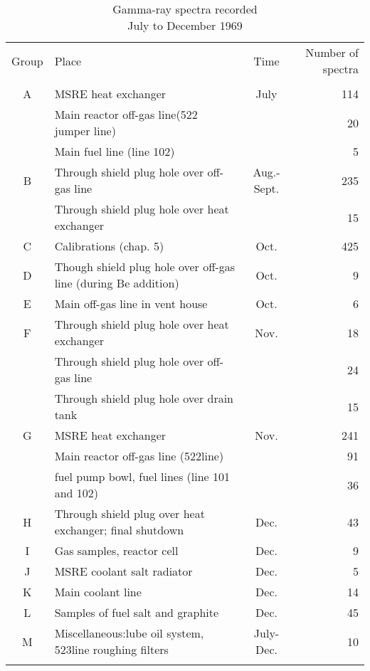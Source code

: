 \begin{table}
\centering
\onelinecaptionsfalse
\caption{Gamma-ray spectra recorded\protect \\July to December 1969}
\label{table_6_1}
\begin{tabular}[c]{clcr}
\hline
\multirow{3}{1cm}{Group } & \multirow{3}{2cm}{Place} &  
\multirow{3}{2cm}{Time}&  \multirow{3}{1cm}{Number of spectra}\\
		\\
		\\
\hline
\\
A  &  MSRE heat exchanger  & July  & 114  \\
   &  Main reactor off-gas line(522 jumper line) &   & 20 \\
   &  Main fuel line (line 102) &  & 5  \\
B  &  Through shield plug hole over off-gas line  & Aug.-Sept.  & 235  \\
   &  Through shield plug hole over heat exchanger &  & 15  \\
C  &  Calibrations (chap. 5)  & Oct.  & 425  \\
D  &  Though shield plug hole over off-gas line (during Be addition)  & Oct.  & 9  \\
E  &  Main off-gas line in vent house   & Oct.  &6  \\
F  &  Through shield plug hole over heat exchanger   & Nov.  & 18  \\
   &   Through shield plug hole over off-gas line  & & 24  \\
   &  Through shield plug hole over drain tank  &  & 15  \\
 G &  MSRE heat exchanger   & Nov.  &241  \\
  &   Main reactor off-gas line (522line) & & 91  \\
  &   fuel pump bowl, fuel lines (line 101 and 102) &  &36  \\
 H &  Through shield plug over heat exchanger; final shutdown  & Dec.   & 43 \\
 I &  Gas samples, reactor cell  & Dec.  &9  \\
J  &  MSRE coolant salt radiator  & Dec.  &5  \\
K  &  Main coolant line  &Dec.   &14  \\
L  &  Samples of fuel salt and graphite  &Dec.   &45  \\
M  &  Miscellaneous:lube oil system, 523line roughing filters  &July-Dec.   &10  \\
\\
\hline
\end{tabular}
\end{table}


